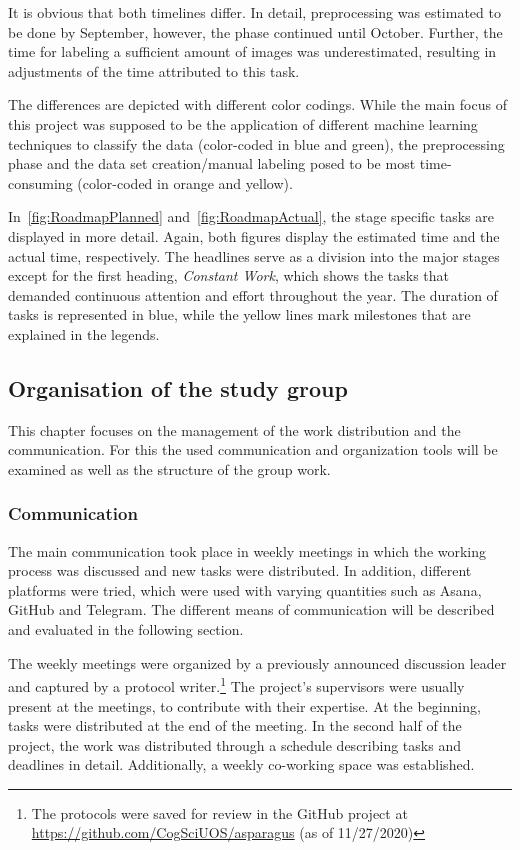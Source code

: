It is obvious that both timelines differ. In detail, preprocessing was estimated to be done by September, however, the phase continued until October. Further, the time for labeling a sufficient amount of images was underestimated, resulting in adjustments of the time attributed to this task.

The differences are depicted with different color codings. While the main focus of this project was supposed to be the application of different machine learning techniques to classify the data (color-coded in blue and green), the preprocessing phase and the data set creation/manual labeling posed to be most time-consuming (color-coded in orange and yellow).

In~\autoref{fig:RoadmapPlanned} and~\autoref{fig:RoadmapActual}, the stage specific tasks are displayed in more detail. Again, both figures display the estimated time and the actual time, respectively. The headlines serve as a division into the major stages except for the first heading, \emph{Constant Work}, which shows the tasks that demanded continuous attention and effort throughout the year. The duration of tasks is represented in blue, while the yellow lines mark milestones that are explained in the legends.


\subsection{Organisation of the study group}
\label{sec:Organization}

This chapter focuses on the management of the work distribution and the communication. For this the used communication and organization tools will be examined as well as the structure of the group work.


\subsubsection{Communication}
\label{subsec:Communication}

The main communication took place in weekly meetings in which the working process was discussed and new tasks were distributed. In addition, different platforms were tried, which were used with varying quantities such as Asana, GitHub and Telegram. The different means of communication will be described and evaluated in the following section.

\bigskip
The weekly meetings were organized by a previously announced discussion leader and captured by a protocol writer.\footnote{The protocols were saved for review in the GitHub project at \\ \url{https://github.com/CogSciUOS/asparagus} (as of 11/27/2020)} The project’s supervisors were usually present at the meetings, to contribute with their expertise. At the beginning, tasks were distributed at the end of the meeting. In the second half of the project, the work was distributed through a schedule describing tasks and deadlines in detail. Additionally, a weekly co-working space was established. 


